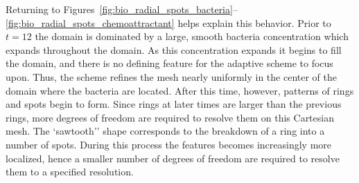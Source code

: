 Returning to Figures~\ref{fig:bio_radial_spots_bacteria}--\ref{fig:bio_radial_spots_chemoattractant} helps explain this behavior.  Prior to $t=12$ the domain is dominated by a large, smooth bacteria concentration which expands throughout the domain.  As this concentration expands it begins to fill the domain, and there is no defining feature for the adaptive scheme to focus upon.  Thus, the scheme refines the mesh nearly uniformly in the center of the domain where the bacteria are located.  After this time, however, patterns of rings and spots begin to form.  Since rings at later times are larger than the previous rings, more degrees of freedom are required to resolve them on this Cartesian mesh.  The `sawtooth'' shape corresponds to the breakdown of a ring into a number of spots.  During this process the features becomes increasingly more localized, hence a smaller number of degrees of freedom are required to resolve them to a specified resolution.



